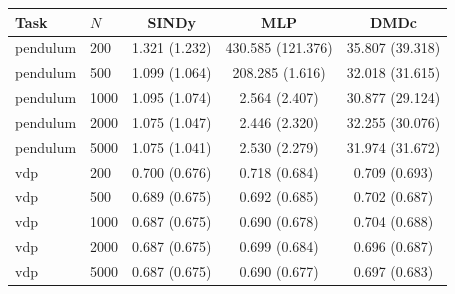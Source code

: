 \begin{tabular}{llccc}\toprule
Task & $N$ & SINDy & MLP & DMDc \\\midrule
pendulum & 200 & 1.321 (1.232) & 430.585 (121.376) & 35.807 (39.318) \\
pendulum & 500 & 1.099 (1.064) & 208.285 (1.616) & 32.018 (31.615) \\
pendulum & 1000 & 1.095 (1.074) & 2.564 (2.407) & 30.877 (29.124) \\
pendulum & 2000 & 1.075 (1.047) & 2.446 (2.320) & 32.255 (30.076) \\
pendulum & 5000 & 1.075 (1.041) & 2.530 (2.279) & 31.974 (31.672) \\
\midrule
vdp & 200 & 0.700 (0.676) & 0.718 (0.684) & 0.709 (0.693) \\
vdp & 500 & 0.689 (0.675) & 0.692 (0.685) & 0.702 (0.687) \\
vdp & 1000 & 0.687 (0.675) & 0.690 (0.678) & 0.704 (0.688) \\
vdp & 2000 & 0.687 (0.675) & 0.699 (0.684) & 0.696 (0.687) \\
vdp & 5000 & 0.687 (0.675) & 0.690 (0.677) & 0.697 (0.683) \\
\bottomrule\end{tabular}
